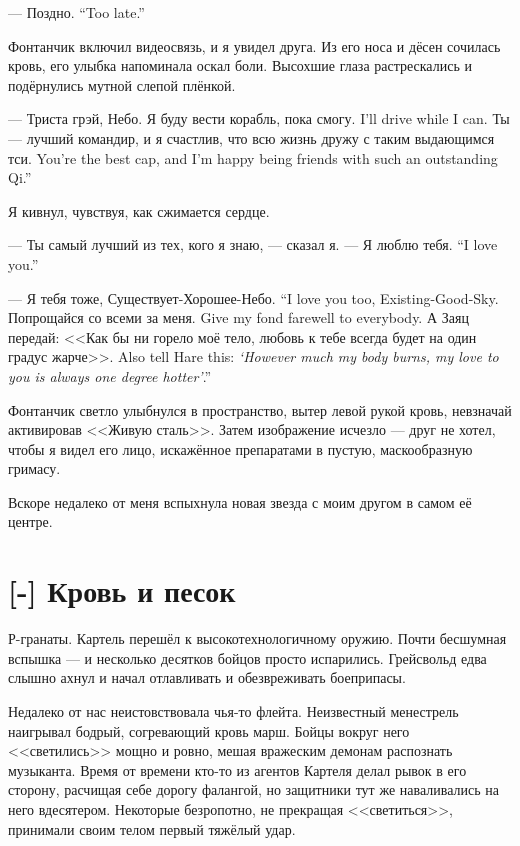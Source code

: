 {--- Поздно.}
{``Too late.''}

Фонтанчик включил видеосвязь, и я увидел друга.
Из его носа и дёсен сочилась кровь, его улыбка напоминала оскал боли.
Высохшие глаза растрескались и подёрнулись мутной слепой плёнкой.

--- Триста грэй, Небо.
{Я буду вести корабль, пока смогу.}
{I'll drive while I can.}
{Ты --- лучший командир, и я счастлив, что всю жизнь дружу с таким выдающимся тси.}
{You're the best cap, and I'm happy being friends with such an outstanding Qi.''}

Я кивнул, чувствуя, как сжимается сердце.

--- Ты самый лучший из тех, кого я знаю, --- сказал я.
{--- Я люблю тебя.}
{``I love you.''}

{--- Я тебя тоже, Существует-Хорошее-Небо.}
{``I love you too, Existing-Good-Sky.}
{Попрощайся со всеми за меня.}
{Give my fond farewell to everybody.}
{А Заяц передай: <<Как бы ни горело моё тело, любовь к тебе всегда будет на один градус жарче>>.}
{Also tell Hare this: \emph{`However much my body burns, my love to you is always one degree hotter'}.''}

Фонтанчик светло улыбнулся в пространство, вытер левой рукой кровь, невзначай активировав <<Живую сталь>>.
Затем изображение исчезло --- друг не хотел, чтобы я видел его лицо, искажённое препаратами в пустую, маскообразную гримасу.

Вскоре недалеко от меня вспыхнула новая звезда с моим другом в самом её центре.

\section{[-] Кровь и песок}

\textspace

Р-гранаты.
Картель перешёл к высокотехнологичному оружию.
Почти бесшумная вспышка --- и несколько десятков бойцов просто испарились.
Грейсвольд едва слышно ахнул и начал отлавливать и обезвреживать боеприпасы.

Недалеко от нас неистовствовала чья-то флейта.
Неизвестный менестрель наигрывал бодрый, согревающий кровь марш.
Бойцы вокруг него <<светились>> мощно и ровно, мешая вражеским демонам распознать музыканта.
Время от времени кто-то из агентов Картеля делал рывок в его сторону, расчищая себе дорогу фалангой, но защитники тут же наваливались на него вдесятером.
Некоторые безропотно, не прекращая <<светиться>>, принимали своим телом первый тяжёлый удар.

